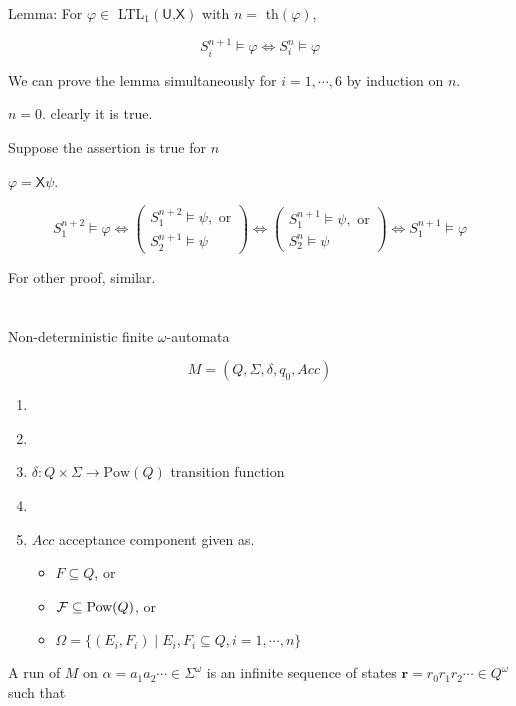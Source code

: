 \documentclass[12pt]{article}
\begin{document}
\begin{CJK*}{GBK}{song}
Lemma: For $\varphi\in $ LTL$_1(\textsf{U,X})$ with $n=$ th$(\varphi)$,

$$S^{n+1}_i\models \varphi \Longleftrightarrow S_i^n\models\varphi$$


We can prove the lemma simultaneously for $i=1,\cdots,6$ by induction on $n$.

$n=0$. clearly it is true.

Suppose the assertion is true for $n$

$\varphi=\textsf{X}\psi$.

$$S_1^{n+2}\models \varphi\Longleftrightarrow \left(
\begin{array}{l}
S_1^{n+2}\models \psi, \mbox{ or}\\
S_2^{n+1}\models \psi
\end{array}
\right)\Longleftrightarrow \left(\begin{array}{l}
S_1^{n+1}\models \psi, \mbox{ or}\\
S_2^{n}\models \psi
\end{array}
\right)\Longleftrightarrow S_1^{n+1}\models \varphi$$

For other proof, similar.\\



\ \\ \ \\

Non-deterministic finite $\omega$-automata

$$M=(Q,\Sigma,\delta,q_0, Acc)$$


\begin{enumerate}
\item \
\item \
\item $\delta:Q\times\Sigma\rightarrow\mbox{Pow}(Q)$ transition function
\item \
\item $Acc$ acceptance component given as.
\begin{itemize}
\item $F\subseteq Q$, or
\item ${\cal F}\subseteq\mbox{Pow}(Q)$, or
\item $\Omega=\{(E_i,F_i)\mid E_i, F_i\subseteq Q, i=1,\cdots,n\}$
\end{itemize}
\end{enumerate}

A run of $M$ on $\alpha=a_1a_2\cdots\in\Sigma^{\omega}$ is an infinite sequence of states $\mathbf{r}=r_0r_1r_2\cdots\in Q^{\omega}$ such that


\end{CJK*}
\end{document}
